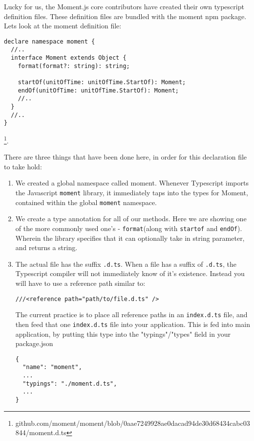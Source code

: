 Lucky for us, the Moment.js core contributors have created their own typescript definition files. These definition files are bundled with the moment npm package. Lets look at the moment definition file:

\begin{lstlisting}[caption=moment.d.ts currently at the time of writing 736 lines long chockfull with interfaces for the Moment library]
declare namespace moment {
  //..
  interface Moment extends Object {
    format(format?: string): string;

    startOf(unitOfTime: unitOfTime.StartOf): Moment;
    endOf(unitOfTime: unitOfTime.StartOf): Moment;
    //..
  }
  //..
}
\end{lstlisting}
\footnote{github.com/moment/moment/blob/0aae7249928ae0dacad94de30d68434cabc03844/moment.d.ts}.  

There are three things that have been done here, in order for this declaration file to take hold:
\begin{enumerate}
\item We created a global namespace called moment. Whenever Typescript imports the Javascript \lstinline{moment} library, it immediately taps into the types for Moment, contained within the global \lstinline{moment} namespace.
\item We create a type annotation for all of our methods. Here we are showing one of the more commonly used one's - \lstinline{format}(along with \lstinline{startof} and \lstinline{endOf}). Wherein the library specifies that it can optionally take in string parameter, and returns a string.
\item The actual file has the suffix \lstinline{.d.ts}. When a file has a suffix of \lstinline{.d.ts}, the Typescript compiler will not immediately know of it's existence. Instead you will have to use a reference path similar to:
\begin{verbatim} 
///<reference path="path/to/file.d.ts" />
\end{verbatim} 
The current practice is to place all reference paths in an \lstinline{index.d.ts} file, and then feed that one \lstinline{index.d.ts} file into your application. This is fed into main application, by putting this type into the "typings"/"types" field in your package.json
\begin{lstlisting}[caption=typings field as used by the moment.js library]
{
  "name": "moment",
  ...
  "typings": "./moment.d.ts",
  ...
}  
\end{lstlisting}
\end{enumerate}